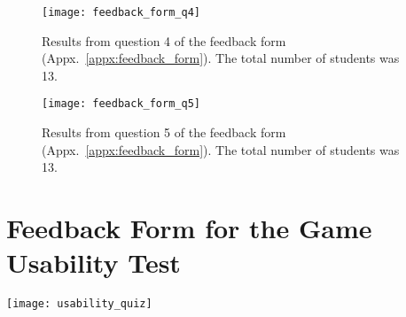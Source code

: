 \begin{appendices}
\begin{figure}[htp]
	\centering
	\texttt{[image: feedback\_form\_q4]}
	\caption[Results from feedback form question 4]{Results from question 4 of the feedback form (Appx.~\ref{appx:feedback_form}). The total number of students was 13.}
	\label{fig:feedback_form_q4}
\end{figure}

\begin{figure}[htp]
	\centering
	\texttt{[image: feedback\_form\_q5]}
	\caption[Results from feedback form question 5]{Results from question 5 of the feedback form (Appx.~\ref{appx:feedback_form}). The total number of students was 13.}
	\label{fig:feedback_form_q5}
\end{figure}

\chapter{Feedback Form for the Game Usability Test}
\label{appx:game_feedback_form}

\texttt{[image: usability\_quiz]}







\end{appendices}